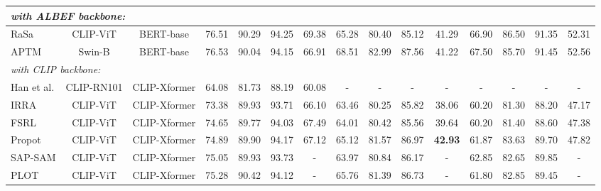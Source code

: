 \begin{table}[t!]
{\begin{tabular}{l|cc|cccc|cccc|cccc}
\multicolumn{6}{l}{\textit{with ALBEF \cite{li2021align} backbone:}} \\
\midrule
RaSa \cite{bai2023rasa}  & CLIP-ViT & BERT-base & 76.51  & 90.29  & 94.25 & 69.38 & 65.28  & 80.40  & 85.12 & 41.29 & 66.90 & 86.50 & 91.35 & 52.31 \\
APTM \cite{yang2023towards} & Swin-B & BERT-base & 76.53  & 90.04  & 94.15 & 66.91 & 68.51 & 82.99 & 87.56 & 41.22 & 67.50 & 85.70 & 91.45 & 52.56 \\ 
\midrule
\multicolumn{6}{l}{\textit{with CLIP \cite{radford2021learning} backbone:}} \\
\midrule
Han et al. \cite{han2021text} & CLIP-RN101 & CLIP-Xformer & 64.08 & 81.73 & 88.19 & 60.08 & - & - & - & - & - & - & - & - \\
IRRA \cite{jiang2023cross} & CLIP-ViT  & CLIP-Xformer & 73.38  & 89.93  & 93.71 & 66.10 & 63.46   & 80.25 & 85.82 & 38.06 & 60.20 & 81.30 & 88.20 & 47.17 \\


\multicolumn{1}{l|}{FSRL \cite{wang2024fine}} & CLIP-ViT & \multicolumn{1}{c|}{CLIP-Xformer} & \multicolumn{1}{l}{74.65} & \multicolumn{1}{l}{89.77} & \multicolumn{1}{l}{94.03} & \multicolumn{1}{c|}{67.49} & 64.01 & 80.42 & 85.56 & \multicolumn{1}{c|}{39.64} & 60.20 & 81.40 & 88.60 & 47.38 \\

\multicolumn{1}{l|}{Propot \cite{yan2024prototypical}} & CLIP-ViT & \multicolumn{1}{c|}{CLIP-Xformer} & \multicolumn{1}{l}{74.89} & \multicolumn{1}{l}{89.90} & \multicolumn{1}{l}{94.17} & \multicolumn{1}{c|}{67.12} & 65.12 & 81.57 & 86.97 & \multicolumn{1}{c|}{\textbf{42.93}} & 61.87 & 83.63 & 89.70 & 47.82 \\

\multicolumn{1}{l|}{SAP-SAM \cite{wang2024fine}} & CLIP-ViT & \multicolumn{1}{c|}{CLIP-Xformer} & \multicolumn{1}{l}{75.05} & \multicolumn{1}{l}{89.93} & \multicolumn{1}{l}{93.73} & \multicolumn{1}{c|}{-} & 63.97 & 80.84 & 86.17 & \multicolumn{1}{c|}{-} & 62.85 & 82.65 & 89.85 & - \\

\multicolumn{1}{l|}{PLOT \cite{park2025plot}} & CLIP-ViT & \multicolumn{1}{c|}{CLIP-Xformer} & \multicolumn{1}{l}{75.28} & \multicolumn{1}{l}{90.42} & \multicolumn{1}{l}{94.12} & \multicolumn{1}{c|}{-} & 65.76 & 81.39 & 86.73 & \multicolumn{1}{c|}{-} & 61.80 & 82.85 & 89.45 & - \\


\end{tabular}}
\end{table}
